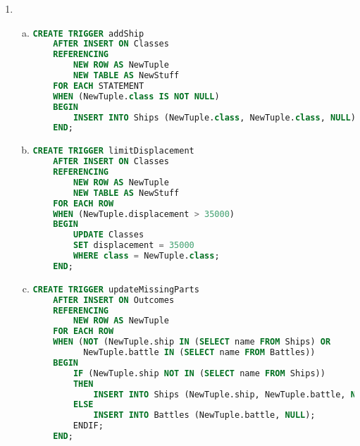 \documentclass[12pt]{article}
\begin{document}
\begin{enumerate}[1.]
\begin{enumerate}[a)]
\begin{lstlisting}[language=SQL]
    INSERT INTO PC NewTuple;
    END;

    /

    CREATE TRIGGER checkInsertLaptop
    BEFORE INSERT ON Laptop
    REFERENCING
        NEW ROW AS NewTuple
    FOR EACH ROW
    BEGIN
    WHEN (NOT NewTuple.model IN (
        (SELECT model FROM PC)
        UNION
        (SELECT model FROM Laptop)
        UNION
        (SELECT model FROM Printer)
    ))

    INSERT INTO Laptop NewTuple;
    END;

    /

    CREATE TRIGGER checkInsertPrinter
    BEFORE INSERT ON Laptop
    REFERENCING
        NEW ROW AS NewTuple
    FOR EACH ROW
    BEGIN
    WHEN (NOT NewTuple.model IN (
        (SELECT model FROM PC)
        UNION
        (SELECT model FROM Laptop)
        UNION
        (SELECT model FROM Printer)
    ))

    INSERT INTO Printer NewTuple;
    END;
    \end{lstlisting}

    \end{enumerate}

    \item

    \begin{enumerate}[a)]
        \item

    \begin{lstlisting}[language=SQL]
    CREATE TRIGGER addShip
    AFTER INSERT ON Classes
    REFERENCING
        NEW ROW AS NewTuple
        NEW TABLE AS NewStuff
    FOR EACH STATEMENT
    WHEN (NewTuple.class IS NOT NULL)
    BEGIN
        INSERT INTO Ships (NewTuple.class, NewTuple.class, NULL)
    END;
    \end{lstlisting}

        \item

    \begin{lstlisting}[language=SQL]
    CREATE TRIGGER limitDisplacement
    AFTER INSERT ON Classes
    REFERENCING
        NEW ROW AS NewTuple
        NEW TABLE AS NewStuff
    FOR EACH ROW
    WHEN (NewTuple.displacement > 35000)
    BEGIN
        UPDATE Classes
        SET displacement = 35000
        WHERE class = NewTuple.class;
    END;
    \end{lstlisting}

        \item

    \begin{lstlisting}[language=SQL]
    CREATE TRIGGER updateMissingParts
    AFTER INSERT ON Outcomes
    REFERENCING
        NEW ROW AS NewTuple
    FOR EACH ROW
    WHEN (NOT (NewTuple.ship IN (SELECT name FROM Ships) OR
          NewTuple.battle IN (SELECT name FROM Battles))
    BEGIN
        IF (NewTuple.ship NOT IN (SELECT name FROM Ships))
        THEN
            INSERT INTO Ships (NewTuple.ship, NewTuple.battle, NULL);
        ELSE
            INSERT INTO Battles (NewTuple.battle, NULL);
        ENDIF;
    END;
    \end{lstlisting}


\end{enumerate}
\end{enumerate}
\end{document}

